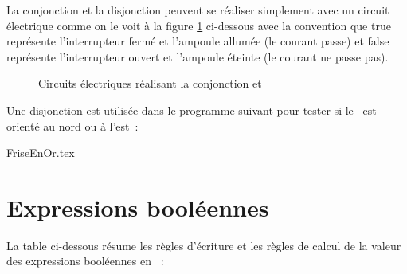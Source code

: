 La conjonction et la disjonction peuvent se réaliser simplement avec un circuit électrique comme on le voit à la figure
\ref{fig:andor} 
ci-dessous
avec la con\-ven\-tion que {\idt true} représente l'interrupteur fermé
et l'ampoule allumée (le courant passe) et {\idt false} représente l'interrupteur ouvert
et l'ampoule éteinte (le courant ne passe pas).

\begin{figure}[htbp]
 \caption{Circuits électriques réalisant la conjonction et\label{fig:andor}}
\end{figure}

Une disjonction est utilisée dans le programme suivant pour tester si le \robot\ est orienté au nord ou à
l'est~:

\vspace{0.3cm}
 {\raggedright 
 {FriseEnOr.tex}
  }

\section{Expressions booléennes}

La table ci-dessous résume les règles d'écriture et les règles de calcul de la valeur
des expressions booléennes en \pascal~:

  

